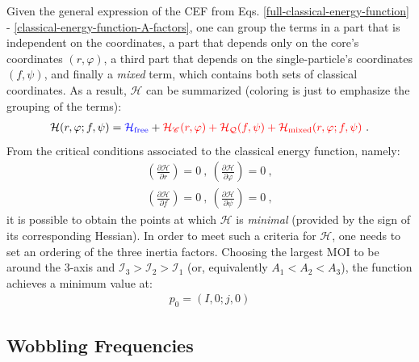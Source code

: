 Given the general expression of the CEF from Eqs. \ref{full-classical-energy-function} - \ref{classical-energy-function-A-factors}, one can group the terms in a part that is independent on the coordinates, a part that depends only on the core's coordinates $(r,\varphi)$, a third part that depends on the single-particle's coordinates $(f,\psi)$, and finally a \emph{mixed} term, which contains both sets of classical coordinates. As a result, $\mathcal{H}$ can be summarized (coloring is just to emphasize the grouping of the terms):
\begin{align}
    \mathcal{H}(r,\varphi;f,\psi)={\color{blue}\mathcal{H}_\text{free}}+{\color{red}\mathcal{H}_\mathscr{C}(r,\varphi)+\mathcal{H}_\mathcal{Q}(f,\psi)+\mathcal{H}_\text{mixed}(r,\varphi;f,\psi)}\ .
    \label{classical-energy-function-terms}
\end{align}
From the critical conditions associated to the classical energy function, namely:
\begin{gather*}
    \left(\frac{\partial \mathcal{H}}{\partial r}\right)=0\ ,\ \left(\frac{\partial \mathcal{H}}{\partial \varphi}\right)=0\ ,\\
    \left(\frac{\partial \mathcal{H}}{\partial f}\right)=0\ ,\ \left(\frac{\partial \mathcal{H}}{\partial \psi}\right)=0\ ,
\end{gather*}
it is possible to obtain the points at which $\mathcal{H}$ is \emph{minimal} (provided by the sign of its corresponding Hessian). In order to meet such a criteria for $\mathcal{H}$, one needs to set an ordering of the three inertia factors. Choosing the largest MOI to be around the $3$-axis and $\mathcal{I}_3>\mathcal{I}_2>\mathcal{I}_1$ (or, equivalently $A_1<A_2<A_3$), the function achieves a minimum value at:
\begin{align}
    p_0=(I,0;j,0)
    \label{cef-minimum-point-p0}
\end{align}

\subsection{Wobbling Frequencies}


